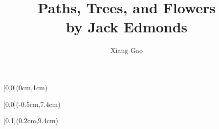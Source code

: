 \documentclass[hyperref={pdfpagelabels=false}]{beamer}
\title{Paths, Trees, and Flowers \\ by Jack Edmonds}
\author{Xiang Gao}
\institute{ETH Zurich -- Distributed Computing Group -- www.disco.ethz.ch}
\begin{document}
{
\begin{frame}
	\begin{textblock*}{\paperwidth}[0,0](0cm,1cm)
		\begin{center}
			\textbf{\huge \inserttitle}
		\end{center}
	\end{textblock*}
	\begin{textblock*}{\paperwidth}[0,0](-0.5cm,7.4cm)
		\flushright
		\color{white}
		\itshape \insertauthor
	\end{textblock*}
	\begin{textblock*}{\paperwidth}[0,1](0.2cm,9.4cm)
		\flushleft
		\tiny \itshape \insertinstitute
	\end{textblock*}
\end{frame}
}

\frame{\tableofcontents}


\end{document}
